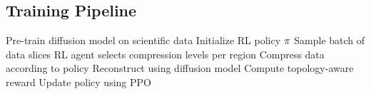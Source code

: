 \subsection{Training Pipeline}

\begin{algorithm}[h]
\caption{RL-Diffusion Compression Training}
\begin{algorithmic}[1]
\State Pre-train diffusion model on scientific data
\State Initialize RL policy $\pi$
    \State Sample batch of data slices
    \State RL agent selects compression levels per region
    \State Compress data according to policy
    \State Reconstruct using diffusion model
    \State Compute topology-aware reward
    \State Update policy using PPO
\EndFor
\end{algorithmic}
\end{algorithm}
